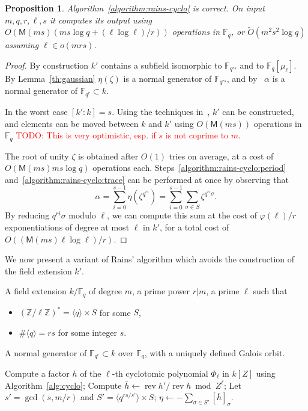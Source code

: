 \documentclass[12pt]{article}
\theoremstyle{plain}
\newtheorem{proposition}[theorem]{Proposition}
\theoremstyle{definition}
\newcommand{\tildO}{\tilde{O}}
\newcommand{\todo}[1]{\textcolor{red}{TODO: #1}}
\DeclareMathOperator{\rev}{rev}
\def\Z{\ensuremath{\mathbb{Z}}}
\def\F{\ensuremath{\mathbb{F}}}
\def\MM{\ensuremath{\mathsf{M}}}
\def\euler{\ensuremath{\varphi}}
\newcounter{algorithm}
\begin{document}
\begin{proposition}
  Algorithm~\ref{algorithm:rains-cyclo} is correct. On input
  $m,q,r,\ell,s$ it computes its output using $O(\MM(ms)(ms\log q +
  (\ell\log\ell)/r))$ operations in $\F_q$, or $\tildO(m^2s^2\log q)$
  assuming $\ell\in o(mrs)$.
\end{proposition}
\begin{proof}
  By construction $k'$ contains a subfield isomorphic to $\F_{q^{rs}}$
  and to $\F_q[\mu_\ell]$. By Lemma~\ref{th:gaussian} $\eta(\zeta)$ is
  a normal generator of $\F_{q^{rs}}$, and
  by~\cite[Prop.~5.2.3.1]{mullen2013handbook} $\alpha$ is a normal generator of
  $\F_{q^r}\subset k$.

  In the worst case $[k':k]=s$. Using the techniques
  in~\cite{couveignes+lercier11,DeDoSc13,DeFeo:2014:FAA:2608628.2608672},
  $k'$ can be constructed, and elements can be moved between $k$ and
  $k'$ using $O(\MM(ms))$ operations in $\F_q$ \todo{This is very
    optimistic, esp. if $s$ is not coprime to $m$}.

  The root of unity $\zeta$ is obtained after $O(1)$ tries on average,
  at a cost of $O(\MM(ms)ms\log q)$ operations each.
  Steps~\ref{algorithm:rains-cyclo:period}
  and~\ref{algorithm:rains-cyclo:trace} can be performed at once by
  observing that
  \[\alpha = \sum_{i=0}^{s-1}\eta(\zeta^{q^{ri}})= \sum_{i=0}^{s-1}\sum_{\sigma\in S}\zeta^{q^{ri}\sigma}.\]
  By reducing $q^{ri}\sigma$ modulo $\ell$, we can compute this sum at
  the cost of $\euler(\ell)/r$ exponentiations of degree at most
  $\ell$ in $k'$, for a total cost of $O((\MM(ms)\ell\log\ell)/r)$.
\end{proof}

We now present a variant of Rains' algorithm which avoids the
construction of the field extension $k'$. 

\begin{algorithm}
  \label{algorithm:rains-cyclo-2}
  \begin{algorithmic}[1]
    \REQUIRE A field extension $k/\F_q$ of degree $m$, a prime power
    $r|m$, a prime $\ell$ such that
    \begin{itemize}
    \item $(\Z/\ell\Z)^\ast = \langle q\rangle \times S$ for some $S$,
    \item $\#\langle q\rangle = rs$ for some integer $s$.
    \end{itemize}
    \ENSURE A normal generator of $\F_{q^r}\subset k$ over $\F_q$,
    with a uniquely defined Galois orbit.
    
    \STATE Compute a factor $h$ of the $\ell$-th cyclotomic polynomial $\Phi_\ell$ in $k[Z]$ using Algorithm~\ref{alg:cyclo}; 
    \STATE Compute $\bar{h} \leftarrow \rev{h'}/\rev{h} \bmod Z^\ell$;
    \STATE Let $s'=\gcd(s,m/r)$ and $S' = \langle q^{rs/s'}\rangle \times S$;
    \RETURN\label{algorithm:rains-cyclo:period} $\eta \leftarrow -\sum_{\sigma\in S'}[\bar{h}]_\sigma$.
  \end{algorithmic}
\end{algorithm}
\end{document}

